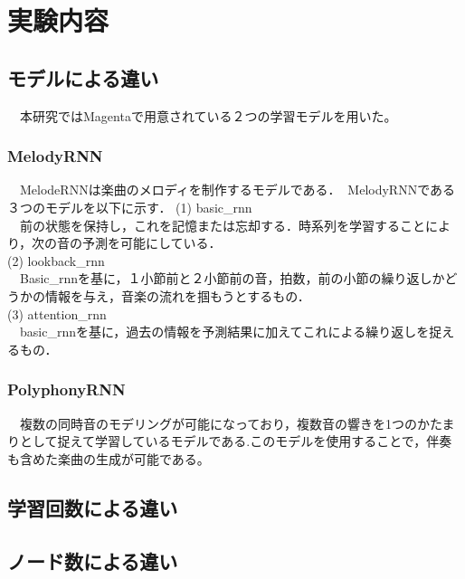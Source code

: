 \chapter{実験内容}
\section{モデルによる違い}
　本研究ではMagentaで用意されている２つの学習モデルを用いた。\\

\subsection{MelodyRNN}
　MelodeRNNは楽曲のメロディを制作するモデルである．MelodyRNNである３つのモデルを以下に示す．
(1)	basic_rnn\\
　前の状態を保持し，これを記憶または忘却する．時系列を学習することにより，次の音の予測を可能にしている．\\
(2)	lookback_rnn\\
　Basic_rnnを基に，１小節前と２小節前の音，拍数，前の小節の繰り返しかどうかの情報を与え，音楽の流れを掴もうとするもの．\\
(3)	attention_rnn\\
　basic_rnnを基に，過去の情報を予測結果に加えてこれによる繰り返しを捉えるもの．\\
\subsection{PolyphonyRNN}
　複数の同時音のモデリングが可能になっており，複数音の響きを1つのかたまりとして捉えて学習しているモデルである.このモデルを使用することで，伴奏も含めた楽曲の生成が可能である。\\

\section{学習回数による違い}
\section{ノード数による違い}